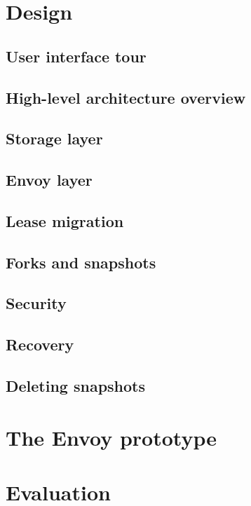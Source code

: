 \documentclass[a4paper]{article}
\begin{document}
\section{Design}

\subsection{User interface tour}
\subsection{High-level architecture overview}
\subsection{Storage layer}
\subsection{Envoy layer}
\subsection{Lease migration}
\subsection{Forks and snapshots}
\subsection{Security}
\subsection{Recovery}
\subsection{Deleting snapshots}

\section{The Envoy prototype}

\subsection{}

\section{Evaluation}
\end{document}
